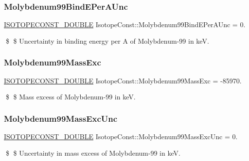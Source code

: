 \subsubsection{\texorpdfstring{Molybdenum99\+Bind\+E\+Per\+A\+Unc}{Molybdenum99BindEPerAUnc}}
{\footnotesize\ttfamily \mbox{\hyperlink{group___isotope_const-_macros_ga8f45a7272ce02c0b4c65c44636ed719a}{I\+S\+O\+T\+O\+P\+E\+C\+O\+N\+S\+T\+\_\+\+D\+O\+U\+B\+LE}} Isotope\+Const\+::\+Molybdenum99\+Bind\+E\+Per\+A\+Unc = 0.}

\$ \$ Uncertainty in binding energy per A of Molybdenum-\/99 in keV. \mbox{\label{group___isotope_const-_molybdenum-_mo99_gabf1c984f5561dc5e5f8b05a2c130612e}} 
\subsubsection{\texorpdfstring{Molybdenum99\+Mass\+Exc}{Molybdenum99MassExc}}
{\footnotesize\ttfamily \mbox{\hyperlink{group___isotope_const-_macros_ga8f45a7272ce02c0b4c65c44636ed719a}{I\+S\+O\+T\+O\+P\+E\+C\+O\+N\+S\+T\+\_\+\+D\+O\+U\+B\+LE}} Isotope\+Const\+::\+Molybdenum99\+Mass\+Exc = -\/85970.}

\$ \$ Mass excess of Molybdenum-\/99 in keV. \mbox{\label{group___isotope_const-_molybdenum-_mo99_gaeb46cd49f39e62e4c1fae7f84dd2318b}} 
\subsubsection{\texorpdfstring{Molybdenum99\+Mass\+Exc\+Unc}{Molybdenum99MassExcUnc}}
{\footnotesize\ttfamily \mbox{\hyperlink{group___isotope_const-_macros_ga8f45a7272ce02c0b4c65c44636ed719a}{I\+S\+O\+T\+O\+P\+E\+C\+O\+N\+S\+T\+\_\+\+D\+O\+U\+B\+LE}} Isotope\+Const\+::\+Molybdenum99\+Mass\+Exc\+Unc = 0.}

\$ \$ Uncertainty in mass excess of Molybdenum-\/99 in keV. \mbox{\label{group___isotope_const-_molybdenum-_mo99_gaaab70bd1fe8334b6199195c4232800fe}} 
